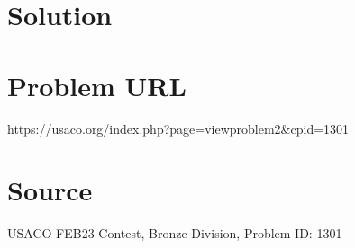 \documentclass[12pt]{article}
\begin{document}
\section*{Solution}


\section*{Problem URL}
https://usaco.org/index.php?page=viewproblem2&cpid=1301

\section*{Source}
USACO FEB23 Contest, Bronze Division, Problem ID: 1301
\end{document}
